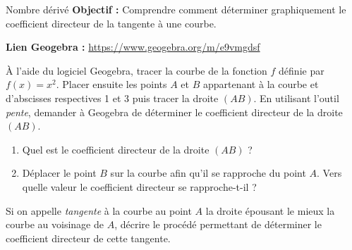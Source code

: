 \documentclass[12pt]{article}
\theoremstyle{break}
\begin{document}
{

\begin{activite*}{Nombre dérivé}{}
    \textbf{Objectif :} Comprendre comment déterminer graphiquement le coefficient directeur de la tangente à une courbe.
\end{activite*}

\noindent
\textbf{Lien Geogebra :} \url{https://www.geogebra.org/m/e9vmgdsf}

\noindent
À l’aide du logiciel Geogebra, tracer la courbe de la fonction $f$ définie par $f(x) = x^2$. Placer ensuite les points $A$ et $B$ appartenant à la courbe et d’abscisses respectives 1 et 3 puis tracer la droite $(AB)$. En utilisant l’outil \textit{pente}, demander à Geogebra de déterminer le coefficient directeur de la droite $(AB)$.

\begin{enumerate}
    \item Quel est le coefficient directeur de la droite $(AB)$ ?
    \item Déplacer le point $B$ sur la courbe afin qu’il se rapproche du point $A$. Vers quelle valeur le coefficient directeur se rapproche-t-il ?
\end{enumerate}

\begin{bilan*}{}{}
    Si on appelle \textit{tangente} à la courbe au point $A$ la droite épousant le mieux la courbe au voisinage de $A$, décrire le procédé permettant de déterminer le coefficient directeur de cette tangente.
\end{bilan*}
}
\end{document}
